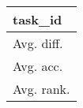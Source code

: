 \begin{tabular}{l}
\toprule
task\_id \\
\midrule
Avg. diff. \\
Avg. acc. \\
Avg. rank. \\
\bottomrule
\end{tabular}
